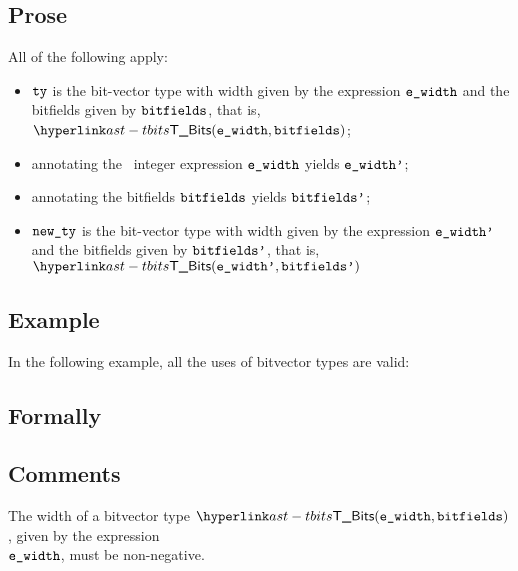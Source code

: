 \subsection{Prose}
All of the following apply:
\begin{itemize}
  \item $\tty$ is the bit-vector type with width given by the expression
    $\ewidth$ and the bitfields given by $\bitfields$, that is, $\TBits(\ewidth, \bitfields)$;
  \item annotating the \staticallyevaluable\  integer expression $\ewidth$ yields $\ewidthp$\ProseOrTypeError;
  \item annotating the bitfields $\bitfields$ yields $\bitfieldsp$\ProseOrTypeError;
  \item $\newty$ is the bit-vector type with width given by the expression
    $\ewidthp$ and the bitfields given by $\bitfieldsp$, that is, $\TBits(\ewidthp, \bitfieldsp)$
\end{itemize}

\subsection{Example}

In the following example, all the uses of bitvector types are valid:

\subsection{Formally}
\begin{mathpar}
\end{mathpar}

\subsection{Comments}
The width of a bitvector type $\TBits(\ewidth, \bitfields)$, given by the expression \\
$\ewidth$,
must be non-negative.

